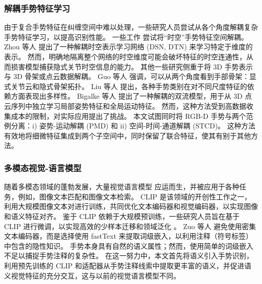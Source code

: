 \subsubsection{解耦手势特征学习}
由于复合手势特征在纠缠空间\cite{zhou2023unified,LI2024110536}中难以处理，一些研究人员尝试从各个角度解耦复杂手势特征学习，以提高识别性能。
一些工作\cite{zhou2022decoupling,LI2024110536} 尝试将“时空”手势特征空间解耦。
Zhou 等人 \cite{zhou2023unified} 提出了一种解耦时空表示学习网络 (DSN, DTN) 来学习特定于维度的表示。
然而，明确地隔离整个网络的时空维度可能会破坏特征的时空连通性，从而损害模型捕获隐式关节时空信息的能力。
其他一些研究侧重于将 3D 手势表示与 3D 骨架或点云数据解耦。
Guo 等人 \cite{GUO2021108044} 强调，可以从两个角度看到手部骨架：显式关节云和隐式骨架拓扑。
Liu 等人\cite{liu2020decoupled} 提出，各种手势类别在对不同尺度特征的依赖方面表现出多样性。
Bigalke 等人 \cite{bigalke2021fusing} 提出了一种解耦的双流模型，用于从 3D 点云序列中独立学习局部姿势特征和全局运动特征。
然而，这种方法受到高数据收集成本的限制，对实际应用提出了挑战。
本文试图同时将 RGB-D 手势与两个范例分离：i) 姿势-运动解耦 (PMD) 和 ii) 空间-时间-通道解耦 (STCD)。
这种方法有效地将细微特征集成到两个子空间中，同时保留了联合特征，使其有别于其他方法。

\subsubsection{多模态视觉-语言模型}
随着多模态领域的蓬勃发展，大量视觉语言模型 \cite{radford2021learning, li2022blip} 应运而生，并被应用于各种任务，例如，图像文本匹配和图像文本检索。
CLIP \cite{radford2021learning} 是该领域的开创性工作之一，利用大规模图像文本对进行训练，共同优化文本编码器和视觉编码器，以实现图像和语义特征对齐。
鉴于 CLIP 依赖于大规模预训练，一些研究人员旨在基于 CLIP 进行微调，以实现高效的少样本迁移和领域泛化 \cite{gao2024clip}。
Zuo 等人 \cite{zuo2023natural} 避免使用密集文本编码器，而是选择使用 fastText 来提取词级嵌入，以利用注释（符号标签）中包含的隐性知识。
手势本身具有自然的语义属性；然而，使用简单的词级嵌入不足以捕捉手势注释的复杂性。
在这一努力中，本文首先将语义引入手势识别，利用预先训练的 CLIP 和适配器从手势注释线索中提取更丰富的语义，并促进语义视觉特征的充分交互，这与以前的视觉语言模型不同。





